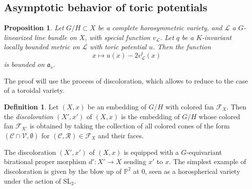 \documentclass{amsart}
\newtheorem{prop}[thm]{Proposition}
\theoremstyle{definition}
\newtheorem{defn}[thm]{Definition}
\begin{document}
\subsection{Asymptotic behavior of toric potentials}

\begin{prop}
\label{prop_loc_bounded_behavior}
Let $G/H\subset X$ be a complete horosymmetric variety, 
and $\mathcal{L}$ a $G$-linearized line bundle on $X$, with special function $v_{\mathcal{L}}$.
Let $q$ be a $K$-invariant locally bounded metric on $\mathcal{L}$ 
with toric potential $u$.
Then the function 
\[
x\mapsto u(x)-2v_{\mathcal{L}}^t(x)
\]
is bounded on $\mathfrak{a}_s$.
\end{prop} 

The proof will use the process of discoloration, which allows to reduce to 
the case of a toroidal variety.

\begin{defn}
Let $(X,x)$ be an embedding of $G/H$ with colored fan $\mathcal{F}_X$.
Then the \emph{discoloration} $(X',x')$ of $(X,x)$ is the embedding 
of $G/H$ whose colored fan $\mathcal{F}_{X'}$ is obtained by 
taking the collection of all colored cones of the form 
$(\mathcal{C}\cap \mathcal{V},\emptyset)$ for 
$(\mathcal{C},\mathcal{R})\in\mathcal{F}_X$ and their faces.
\end{defn}

The discoloration $(X',x')$ of $(X,x)$ is equipped with a $G$-equivariant 
birational proper morphism $d':X'\rightarrow X$ sending $x'$ to $x$. The 
simplest example of discoloration is given by the blow up of $\mathbb{P}^2$ 
at $0$, seen as a horospherical variety under the action of 
$\mathrm{SL}_2$.
\end{document}
